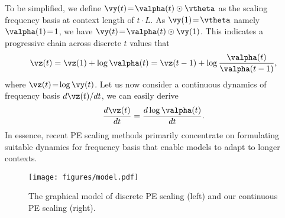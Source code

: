 To be simplified, we define $\vy(t) \!=\! \valpha(t) \odot \vtheta$ as the scaling frequency basis at context length of $t \cdot L$. As  $\vy(1) \!=\!  \vtheta$ namely $\valpha(1) \!=\! 1$, we have $\vy(t) \!=\! \valpha(t) \odot \vy(1)$. This indicates a progressive chain across discrete $t$ values that 
\begin{equation}
\label{eq:unified}
    \vz(t) = \vz(1) + \log \valpha(t) = \vz(t-1) + \log \frac{\valpha(t)}{\valpha(t-1)},
\end{equation}
where $\vz(t) \!=\! \log \vy(t)$.
Let us now consider a continuous dynamics of frequency basis ${d \vz(t)} / {d t}$, we can easily derive
\begin{equation}
\label{eq:continuous_dynamic}
    \frac{d \vz(t)} {d t} = \frac{d \log \valpha(t) } {d t}.
\end{equation}
In essence, recent PE scaling methods primarily concentrate on formulating suitable dynamics for frequency basis that enable models to adapt to longer contexts.




\begin{figure}[!t]
\centering
\texttt{[image: figures/model.pdf]}
\vspace{-2em}
\caption{The graphical model of discrete PE scaling (left) and our continuous PE scaling (right).}
\label{fig:model}
\end{figure}



